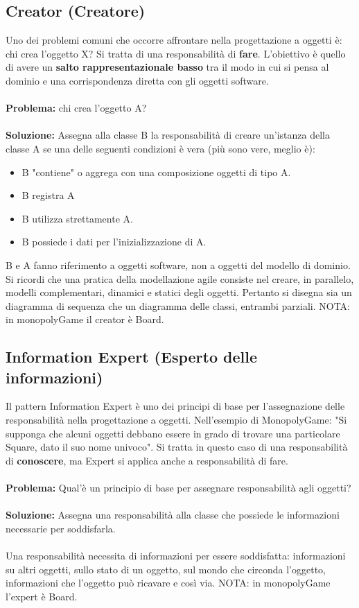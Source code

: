\documentclass{article}
\numberwithin{equation}{subsection}
\begin{document}
\subsection{Creator (Creatore)}
Uno dei problemi comuni che occorre affrontare nella progettazione a oggetti è: chi crea l'oggetto X? Si tratta di una responsabilità di \textbf{fare}. L'obiettivo è quello di avere un \textbf{salto rappresentazionale basso} tra il modo in cui si pensa al dominio e una corrispondenza diretta con gli oggetti software.\\\\
\textbf{Problema: }chi crea l'oggetto A?\\\\
\textbf{Soluzione: }Assegna alla classe B la responsabilità di creare un'istanza della classe A se una delle seguenti condizioni è vera (più sono vere, meglio è):
\begin{itemize}
    \item B "contiene" o aggrega con una composizione oggetti di tipo A.
    \item B registra A
    \item B utilizza strettamente A.
    \item B possiede i dati per l'inizializzazione di A.
\end{itemize}
B e A fanno riferimento a oggetti software, non a oggetti del modello di dominio. Si ricordi che una pratica della modellazione agile consiste nel creare, in parallelo, modelli complementari, dinamici e statici degli oggetti. Pertanto si disegna sia un diagramma di sequenza che un diagramma delle classi, entrambi parziali. NOTA: in monopolyGame il creator è Board.
\subsection{Information Expert (Esperto delle informazioni)}
Il pattern Information Expert è uno dei principi di base per l'assegnazione delle responsabilità nella progettazione a oggetti. Nell'esempio di MonopolyGame: "Si supponga che alcuni oggetti debbano essere in grado di trovare una particolare Square, dato il suo nome univoco". Si tratta in questo caso di una responsabilità di \textbf{conoscere}, ma Expert si applica anche a responsabilità di fare.\\\\
\textbf{Problema: }Qual'è un principio di base per assegnare responsabilità agli oggetti?\\\\
\textbf{Soluzione: }Assegna una responsabilità alla classe che possiede le informazioni necessarie per soddisfarla.\\\\
Una responsabilità necessita di informazioni per essere soddisfatta: informazioni su altri oggetti, sullo stato di un oggetto, sul mondo che circonda l'oggetto, informazioni che l'oggetto può ricavare e così via. NOTA: in monopolyGame l'expert è Board.
\end{document}
